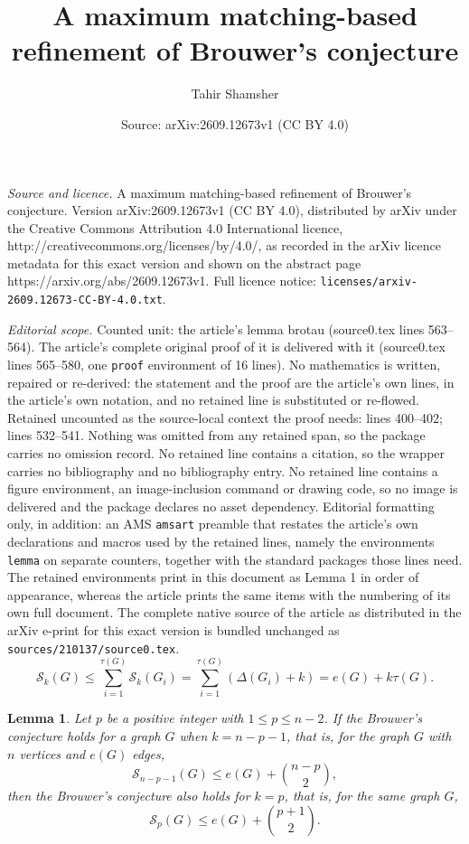 \documentclass[10pt,a4paper]{amsart}
\title{A maximum matching-based refinement of Brouwer’s conjecture}
\author{Tahir Shamsher}
\date{Source: arXiv:2609.12673v1 (CC BY 4.0)}
\newtheorem{lemma}{Lemma}
\begin{document}
\maketitle

\noindent\emph{Source and licence.} A maximum matching-based refinement of Brouwer’s conjecture. Version arXiv:2609.12673v1 (CC BY 4.0), distributed by arXiv under the Creative Commons Attribution 4.0 International licence, http://creativecommons.org/licenses/by/4.0/, as recorded in the arXiv licence metadata for this exact version and shown on the abstract page https://arxiv.org/abs/2609.12673v1. Full licence notice: \texttt{licenses/arxiv-2609.12673-CC-BY-4.0.txt}.\par\smallskip

\noindent\textit{Editorial scope.} Counted unit: the article's lemma brotau (source0.tex lines 563--564). The article's complete original proof of it is delivered with it (source0.tex lines 565--580, one \texttt{proof} environment of 16 lines). No mathematics is written, repaired or re-derived: the statement and the proof are the article's own lines, in the article's own notation, and no retained line is substituted or re-flowed.  Retained uncounted as the source-local context the proof needs: lines 400--402; lines 532--541.  Nothing was omitted from any retained span, so the package carries no omission record.  No retained line contains a citation, so the wrapper carries no bibliography and no bibliography entry.  No retained line contains a figure environment, an image-inclusion command or drawing code, so no image is delivered and the package declares no asset dependency.  Editorial formatting only, in addition: an AMS \texttt{amsart} preamble that restates the article's own declarations and macros used by the retained lines, namely the environments \texttt{lemma} on separate counters, together with the standard packages those lines need.  The retained environments print in this document as Lemma 1 in order of appearance, whereas the article prints the same items with the numbering of its own full document.  The complete native source of the article as distributed in the arXiv e-print for this exact version is bundled unchanged as \texttt{sources/210137/source0.tex}.
		\begin{equation}\label{tauineq}
			\mathcal{S}_k(G)\leq \sum_{i=1}^{\tau(G)}\mathcal{S}_k(G_i)=\sum_{i=1}^{\tau(G)} (\Delta(G_i) + k)=e(G)+k\tau(G).
		\end{equation} 

\begin{lemma} \label{revchen} 
Let $p$ be a positive integer with $1\leq p\leq n-2$. If the Brouwer's conjecture holds for a graph $G$ when $k=n-p-1$, that is, for the graph $G$ with $n$ vertices and $e(G)$ edges,
\begin{equation*}\label{an-p-1}
\mathcal{S}_{n-p-1}(G)\leq e(G)+\binom{n-p}{2}, 
\end{equation*}
then the Brouwer's conjecture also holds for $k=p$, that is, for the same graph $G$,
\begin{equation*}\label{p} 	
\mathcal{S}_{p}(G) \leq e(G)+\binom{p + 1}{2}.
\end{equation*}
\end{lemma}
\end{document}
